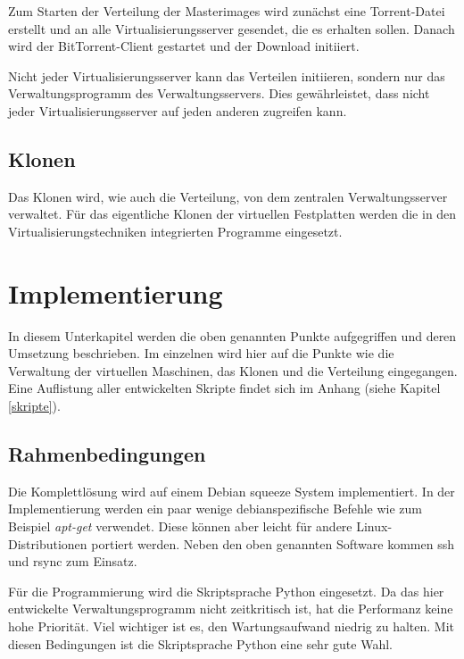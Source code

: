 Zum Starten der Verteilung der Masterimages wird zunächst eine Torrent-Datei erstellt und an alle Virtualisierungsserver gesendet, die es erhalten sollen. Danach wird der BitTorrent-Client gestartet und der Download initiiert.

Nicht jeder Virtualisierungsserver kann das Verteilen initiieren, sondern nur das Verwaltungsprogramm des Verwaltungsservers. Dies gewährleistet, dass nicht jeder Virtualisierungsserver auf jeden anderen zugreifen kann.

\subsection{Klonen}
Das Klonen wird, wie auch die Verteilung, von dem zentralen Verwaltungsserver verwaltet. Für das eigentliche Klonen der virtuellen Festplatten werden die in den Virtualisierungstechniken integrierten Programme eingesetzt. 

\section{Implementierung}
In diesem Unterkapitel werden die oben genannten Punkte aufgegriffen und deren Umsetzung beschrieben. Im einzelnen wird hier auf die Punkte wie die Verwaltung der virtuellen Maschinen, das Klonen und die Verteilung eingegangen. Eine Auflistung aller entwickelten Skripte findet sich im Anhang (siehe Kapitel \ref{skripte}).

\subsection{Rahmenbedingungen}
Die Komplettlösung wird auf einem Debian squeeze System implementiert. In der Implementierung werden ein paar wenige debianspezifische Befehle wie zum Beispiel \textit{apt-get} verwendet. Diese können aber leicht für andere Linux-Distributionen portiert werden. Neben den oben genannten Software kommen ssh und rsync zum Einsatz.

Für die Programmierung wird die Skriptsprache Python eingesetzt. Da das hier entwickelte Verwaltungsprogramm nicht zeitkritisch ist, hat die Performanz keine hohe Priorität. Viel wichtiger ist es, den Wartungsaufwand niedrig zu halten. Mit diesen Bedingungen ist die Skriptsprache Python eine sehr gute Wahl.

